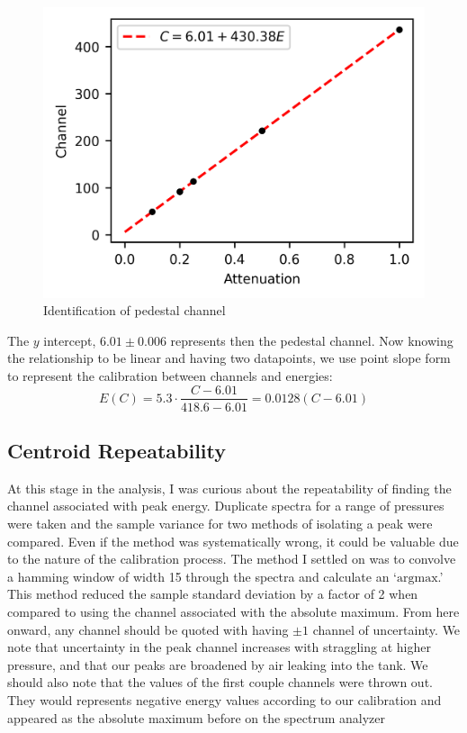 \documentclass[12pt]{article}
\begin{document}
\begin{multicols}{2}
    \begin{figure}[H]
        \includegraphics{charts/calibration.png}
        \caption{Identification of pedestal channel}
    \end{figure}

    The $y$ intercept, $6.01\pm 0.006$ represents then the pedestal channel. Now knowing the relationship to be linear and having two datapoints, we use point slope form to represent the calibration between channels and energies:
    \begin{equation}
        E(C) = 5.3 \cdot \frac{C - 6.01}{418.6 - 6.01} = 0.0128(C - 6.01)
        \label{calibration}
    \end{equation}

    \subsection{Centroid Repeatability}
    \label{centroid}
    At this stage in the analysis, I was curious about the repeatability of finding the channel associated with peak energy. Duplicate spectra for a range of pressures were taken and the sample variance for two methods of isolating a peak were compared. Even if the method was systematically wrong, it could be valuable due to the nature of the calibration process. The method I settled on was to convolve a hamming window of width 15 through the spectra and calculate an `$\text{argmax}$.' This method reduced the sample standard deviation by a factor of 2 when compared to using the channel associated with the absolute maximum. From here onward, any channel should be quoted with having $\pm 1$ channel of uncertainty. We note that uncertainty in the peak channel increases with straggling at higher pressure, and that our peaks are broadened by air leaking into the tank. We should also note that the values of the first couple channels were thrown out. They would represents negative energy values according to our calibration and appeared as the absolute maximum before on the spectrum analyzer


\end{multicols}
\end{document}
